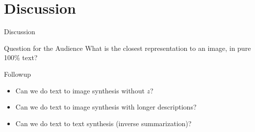 \documentclass{beamer}
\begin{document}
\section{Discussion}
\begin{frame}{}
\centering
Discussion
\end{frame}


\begin{frame}{Question for the Audience}
What is the closest representation to an image, in pure 100\% text?
\vskip 0.5cm

\begin{block}{Followup}
\begin{itemize}
\item Can we do text to image synthesis without $z$?
\item Can we do text to image synthesis with longer descriptions?
\item Can we do text to text synthesis (inverse summarization)?
\end{itemize}
\end{block}

\end{frame}
\end{document}
